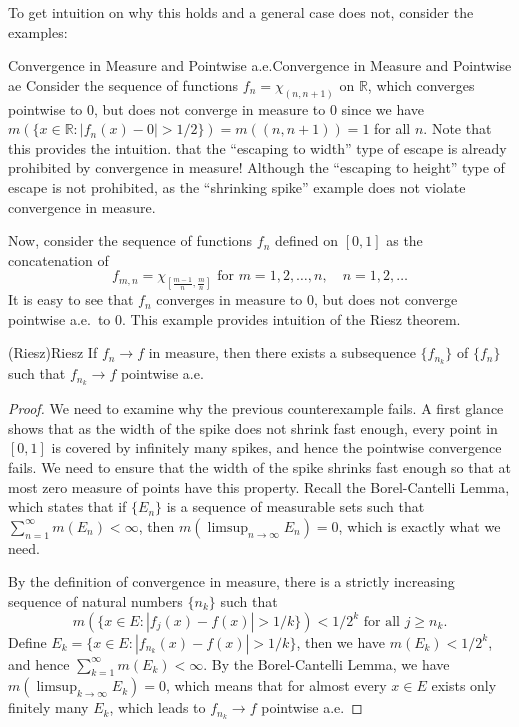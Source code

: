 \documentclass[../main.tex]{subfiles}
\begin{document}
To get intuition on why this holds and a general case does not, consider the examples:
\begin{example}{Convergence in Measure and Pointwise a.e.}{Convergence in Measure and Pointwise ae}
	Consider the sequence of functions $f_n = \chi_{(n, n+1)}$ on $\mathbb{R}$, which converges pointwise to $0$, but does not converge in measure to $0$ since we have $m(\{ x \in \mathbb{R} : |f_n(x) - 0| > 1/2 \}) = m((n, n+1)) = 1$ for all $n$. Note that this provides the intuition. that the ``escaping to width'' type of escape is already prohibited by convergence in measure! Although the ``escaping to height'' type of escape is not prohibited, as the ``shrinking spike'' example does not violate convergence in measure.

	\medskip
	Now, consider the sequence of functions $f_n$ defined on $[0, 1]$ as the concatenation of
	\begin{equation}
		f_{m,n} = \chi_{[\frac{m-1}{n}, \frac{m}{n}]} \text{ for } m = 1, 2, \ldots, n, \quad n = 1, 2, \ldots
	\end{equation}
	It is easy to see that $f_n$ converges in measure to $0$, but does not converge pointwise a.e.\ to $0$. This example provides intuition of the Riesz theorem.
\end{example}

\begin{theorem}{(Riesz)}{Riesz}
	If $f_n \to f$ in measure, then there exists a subsequence $\{ f_{n_k} \}$ of $\{ f_n \}$ such that $f_{n_k} \to f$ pointwise a.e.
\end{theorem}
\begin{proof}
	We need to examine why the previous counterexample fails. A first glance shows that as the width of the spike does not shrink fast enough, every point in $[0, 1]$ is covered by infinitely many spikes, and hence the pointwise convergence fails. We need to ensure that the width of the spike shrinks fast enough so that at most zero measure of points have this property. Recall the Borel-Cantelli Lemma, which states that if $\{ E_n \}$ is a sequence of measurable sets such that $\sum_{n=1}^{\infty} m(E_n) < \infty$, then $m(\limsup_{n \to \infty} E_n) = 0$, which is exactly what we need.

	By the definition of convergence in measure, there is a strictly increasing sequence of natural numbers $\{ n_k \}$ such that
	\begin{equation}
		m(\{ x \in E : |f_j(x) - f(x)| > 1/k \}) < 1/2^k \text{ for all } j \geq n_k.
	\end{equation}
	Define $E_k = \{ x \in E : |f_{n_k}(x) - f(x)| > 1/k \}$, then we have $m(E_k) < 1/2^k$, and hence $\sum_{k=1}^{\infty} m(E_k) < \infty$. By the Borel-Cantelli Lemma, we have $m(\limsup_{k \to \infty} E_k) = 0$, which means that for almost every $x \in E$ exists only finitely many $E_k$, which leads to $f_{n_k} \to f$ pointwise a.e.
\end{proof}
\end{document}
